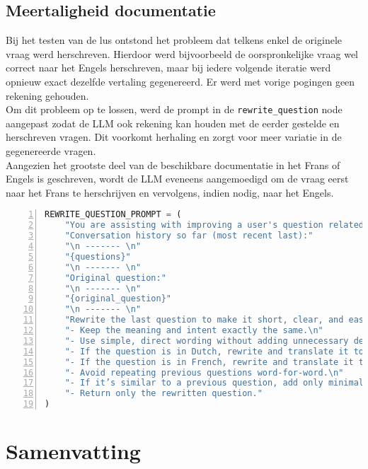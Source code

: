 \subsection{Meertaligheid documentatie}
Bij het testen van de lus ontstond het probleem dat telkens enkel de originele vraag werd herschreven. Hierdoor werd bijvoorbeeld de oorspronkelijke vraag wel correct naar het Engels herschreven, maar bij iedere volgende iteratie werd opnieuw exact dezelfde vertaling gegenereerd. Er werd met vorige pogingen geen rekening gehouden.
\\[1em]
Om dit probleem op te lossen, werd de prompt in de \verb|rewrite_question| node aangepast zodat de LLM ook rekening kan houden met de eerder gestelde en herschreven vragen. Dit voorkomt herhaling en zorgt voor meer variatie in de gegenereerde vragen.
\\[1em]
Aangezien het grootste deel van de beschikbare documentatie in het Frans of Engels is geschreven, wordt de LLM eveneens aangemoedigd om de vraag eerst naar het Frans te herschrijven en vervolgens, indien nodig, naar het Engels.

\begin{lstlisting}[basicstyle=\small, frame=single, breaklines=true, postbreak=\mbox{\textcolor{red}{$\hookrightarrow$}\space}, escapeinside ={\%,}, escapechar={!}, numbers=left, language=Python, caption=Prompt om vraag te herschrijven]
REWRITE_QUESTION_PROMPT = (
    "You are assisting with improving a user's question related to Myminfin IT support.\n"
    "Conversation history so far (most recent last):"
    "\n ------- \n"
    "{questions}"
    "\n ------- \n"
    "Original question:"
    "\n ------- \n"
    "{original_question}"
    "\n ------- \n"
    "Rewrite the last question to make it short, clear, and easy to match with relevant documents in a vector database.\n"
    "- Keep the meaning and intent exactly the same.\n"
    "- Use simple, direct wording without adding unnecessary details.\n"
    "- If the question is in Dutch, rewrite and translate it to French.\n"
    "- If the question is in French, rewrite and translate it to English.\n"
    "- Avoid repeating previous questions word-for-word.\n"
    "- If it’s similar to a previous question, add only minimal context needed for distinction.\n"
    "- Return only the rewritten question."
)
\end{lstlisting}
\section{Samenvatting}

